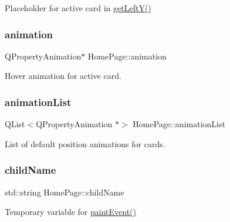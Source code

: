Placeholder for active card in \mbox{\hyperlink{classHomePage_a38c909855e6b1e1a0739642949aa4f9a}{get\+Left\+Y()}} 

\mbox{\label{classHomePage_a3393be0eee7c46695fd059cc6a4fdfc7}} 
\subsubsection{\texorpdfstring{animation}{animation}}
{\footnotesize\ttfamily Q\+Property\+Animation$\ast$ Home\+Page\+::animation\hspace{0.3cm}{\ttfamily [private]}}



Hover animation for active card. 

\mbox{\label{classHomePage_afe801a94e5ae4b4f136a022bf3410411}} 
\subsubsection{\texorpdfstring{animationList}{animationList}}
{\footnotesize\ttfamily Q\+List$<$Q\+Property\+Animation $\ast$$>$ Home\+Page\+::animation\+List\hspace{0.3cm}{\ttfamily [private]}}



List of default position animations for cards. 

\mbox{\label{classHomePage_a07abacb59d135ac5770492ac5ca0e0cf}} 
\subsubsection{\texorpdfstring{childName}{childName}}
{\footnotesize\ttfamily std\+::string Home\+Page\+::child\+Name\hspace{0.3cm}{\ttfamily [private]}}



Temporary variable for \mbox{\hyperlink{classHomePage_ab3daab17f753e46efcec8968333f88b5}{paint\+Event()}} 

\mbox{\label{classHomePage_a0f7d1602b0aa49fbea7693e921e8ab07}} 

